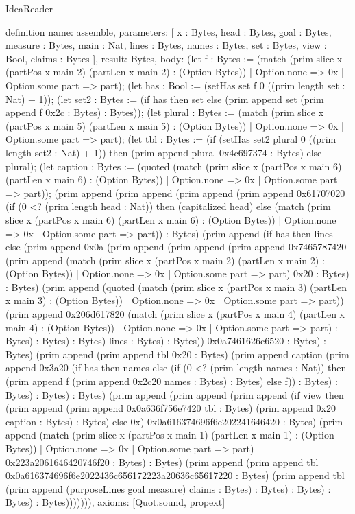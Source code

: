 \begin{lexlean}{IdeaReader}
\begin{semanticmodule}
definition{
  name: assemble,
  parameters: [
    x : Bytes,
    head : Bytes,
    goal : Bytes,
    measure : Bytes,
    main : Nat,
    lines : Bytes,
    names : Bytes,
    set : Bytes,
    view : Bool,
    claims : Bytes
  ],
  result: Bytes,
  body: (let f : Bytes := (match (prim slice x (partPos x main 2) (partLen x main 2) : (Option Bytes))
    | Option.none => 0x
    | Option.some part => part); (let has : Bool := (setHas set f 0 ((prim length set : Nat) + 1)); (let set2 : Bytes := (if has then set else (prim append set (prim append f 0x2c : Bytes) : Bytes)); (let plural : Bytes := (match (prim slice x (partPos x main 5) (partLen x main 5) : (Option Bytes))
    | Option.none => 0x
    | Option.some part => part); (let tbl : Bytes := (if (setHas set2 plural 0 ((prim length set2 : Nat) + 1)) then (prim append plural 0x4c697374 : Bytes) else plural); (let caption : Bytes := (quoted (match (prim slice x (partPos x main 6) (partLen x main 6) : (Option Bytes))
    | Option.none => 0x
    | Option.some part => part)); (prim append (prim append (prim append (prim append 0x61707020 (if (0 <? (prim length head : Nat)) then (capitalized head) else (match (prim slice x (partPos x main 6) (partLen x main 6) : (Option Bytes))
    | Option.none => 0x
    | Option.some part => part)) : Bytes) (prim append (if has then lines else (prim append 0x0a (prim append (prim append (prim append 0x7465787420 (prim append (match (prim slice x (partPos x main 2) (partLen x main 2) : (Option Bytes))
    | Option.none => 0x
    | Option.some part => part) 0x20 : Bytes) : Bytes) (prim append (quoted (match (prim slice x (partPos x main 3) (partLen x main 3) : (Option Bytes))
    | Option.none => 0x
    | Option.some part => part)) (prim append 0x206d617820 (match (prim slice x (partPos x main 4) (partLen x main 4) : (Option Bytes))
    | Option.none => 0x
    | Option.some part => part) : Bytes) : Bytes) : Bytes) lines : Bytes) : Bytes)) 0x0a7461626c6520 : Bytes) : Bytes) (prim append (prim append tbl 0x20 : Bytes) (prim append caption (prim append 0x3a20 (if has then names else (if (0 <? (prim length names : Nat)) then (prim append f (prim append 0x2c20 names : Bytes) : Bytes) else f)) : Bytes) : Bytes) : Bytes) : Bytes) (prim append (prim append (prim append (if view then (prim append (prim append 0x0a636f756e7420 tbl : Bytes) (prim append 0x20 caption : Bytes) : Bytes) else 0x) 0x0a616374696f6e202241646420 : Bytes) (prim append (match (prim slice x (partPos x main 1) (partLen x main 1) : (Option Bytes))
    | Option.none => 0x
    | Option.some part => part) 0x223a2061646420746f20 : Bytes) : Bytes) (prim append (prim append tbl 0x0a616374696f6e2022436c656172223a20636c65617220 : Bytes) (prim append tbl (prim append (purposeLines goal measure) claims : Bytes) : Bytes) : Bytes) : Bytes) : Bytes))))))),
  axioms: [Quot.sound, propext]
}


\end{semanticmodule}
\end{lexlean}
